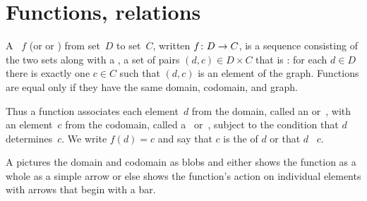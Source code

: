 \documentclass{ibl}  %
\begin{document}











\chapter{Functions, relations}
\begin{df}
A ~$f$ (or  or ) 
from  set~$D$
to  set~$C$, written $\mbox{$f\colon D\to C$}$,
is a sequence consisting of the two sets along with a , 
a set of pairs $(d,c)\in D\times C$ that is 
: for each $d\in D$ there is
exactly one $c\in C$ such that $(d,c)$ is an element of the graph. 
Functions are equal only if they have the same domain, codomain,
and graph.
\end{df}

\noindent Thus a function associates each element~$d$ from the domain,
called an  or~,
with an element~$c$ from the codomain, 
called a~ or~,
subject to the condition that $d$ determines~$c$. 
We write $f(d)=c$ and say that $c$ is the  of $d$ 
or that $d$ ~$c$.

A  pictures the domain and 
codomain as blobs and 
either shows the function as a whole as a simple arrow   
or else shows the function's action on individual elements 
with arrows that begin with a bar.
\begin{center}
  \hspace{8em}
\end{center}
\end{document}
